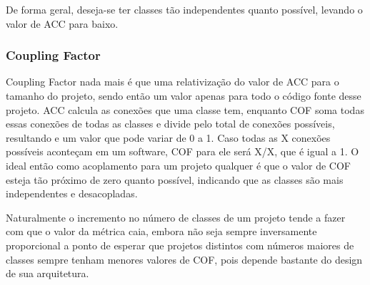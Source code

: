 De forma geral, deseja-se ter classes tão independentes quanto possível, levando o valor de ACC para baixo.

\subsubsection{Coupling Factor}

Coupling Factor nada mais é que uma relativização do valor de ACC para o tamanho do projeto, sendo então um valor apenas para todo o código fonte desse projeto. ACC calcula as conexões que uma classe tem, enquanto COF soma todas essas conexões de todas as classes e divide pelo total de conexões possíveis, resultando e um valor que pode variar de 0 a 1. Caso todas as X conexões possíveis aconteçam em um software, COF para ele será X/X, que é igual a 1. O ideal então como acoplamento para um projeto qualquer é que o valor de COF esteja tão próximo de zero quanto possível, indicando que as classes são mais independentes e desacopladas.

Naturalmente o incremento no número de classes de um projeto tende a fazer com que o valor da métrica caia, embora não seja sempre inversamente proporcional a ponto de esperar que projetos distintos com números maiores de classes sempre tenham menores valores de COF, pois depende bastante do design de sua arquitetura.
